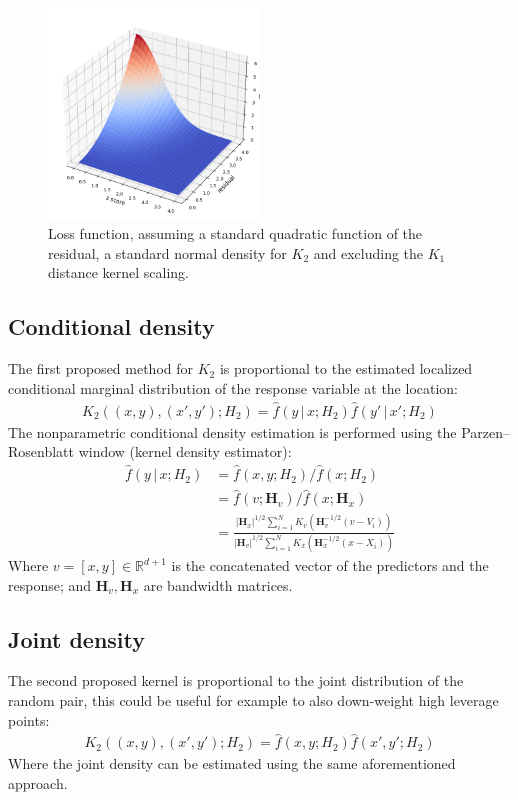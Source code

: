 \documentclass[preprint,1p,times]{elsarticle}
\begin{document}
\begin{figure}[h]
\caption{Loss function, assuming a standard quadratic function of the residual, a standard normal density for $K_2$ and excluding the $K_1$ distance kernel scaling.}
\centering
\includegraphics[width=0.5\textwidth]{loss_2d.png}
\end{figure}

\subsection*{Conditional density} 
The first proposed method for $K_2$ is proportional to the estimated localized conditional marginal distribution of the response variable at the location:
\begin{align}
K_2 \left((x,y),(x', y') ; H_2 \right) = \hat{f}(y \, | \, x ; H_2) \hat{f}(y' \, | \, x'; H_2)
\label{cond_kernel_def}
\end{align}
The nonparametric conditional density estimation is performed using the Parzen–Rosenblatt window (kernel density estimator):
\begin{align}
\hat{f}(y \, | \, x; H_2) &= \hat{f} (x, y ; H_2) / \hat{f} (x; H_2) \\
&= \hat{f} (v ; \mathbf{H}_v) / \hat{f} (x; \mathbf{H}_x) \\
&= \frac{|\mathbf{H}_x|^{1/2} \sum_{i=1}^N K_v \left( \mathbf{H}_v^{-1/2} (v - V_i) \right)} {|\mathbf{H}_v|^{1/2} \sum_{i=1}^N K_x \left( \mathbf{H}_x^{-1/2} (x - X_i) \right)}
\label{conditional_prob_est}
\end{align}
Where $v=[x,y] \in \mathbb{R}^{d+1}$ is the concatenated vector of the predictors and the response; and $\mathbf{H}_v, \mathbf{H}_x$ are bandwidth matrices.
\subsection*{Joint density}
The second proposed kernel is proportional to the joint distribution of the random pair, this could be useful for example to also down-weight high leverage points:
\begin{align}
K_2 \left((x,y),(x', y') ; H_2 \right) = \hat{f}(x,y ; H_2) \hat{f}(x',y'; H_2)
\label{joint_kernel_def}
\end{align}
Where the joint density can be estimated using the same aforementioned approach. \newline
\end{document}
